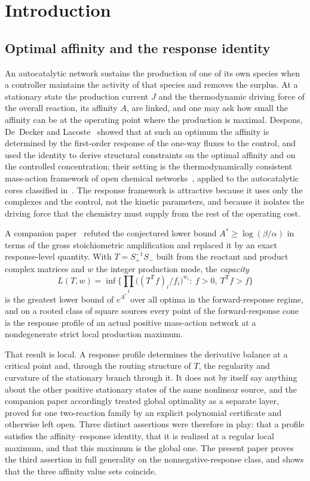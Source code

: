 \documentclass[11pt,a4paper]{article}
\theoremstyle{plain}
\theoremstyle{definition}
\theoremstyle{remark}
\numberwithin{equation}{section}
\newcommand{\T}{\mathsf{T}}
\newcommand{\Sp}{S_{+}}
\newcommand{\Sm}{S_{-}}
\begin{document}
\section{Introduction}\label{sec:intro}

\subsection{Optimal affinity and the response identity}
An autocatalytic network sustains the production of one of its own species when a controller maintains the activity of that species and removes the surplus. At a stationary state the production current $J$ and the thermodynamic driving force of the overall reaction, its affinity $A$, are linked, and one may ask how small the affinity can be at the operating point where the production is maximal. Despons, De~Decker and Lacoste~\citep{despons2024} showed that at such an optimum the affinity is determined by the first-order response of the one-way fluxes to the control, and used the identity to derive structural constraints on the optimal affinity and on the controlled concentration; their setting is the thermodynamically consistent mass-action framework of open chemical networks~\citep{polettini2014,rao2016}, applied to the autocatalytic cores classified in~\citep{blokhuis2020,unterberger2022,nandan2026}. The response framework is attractive because it uses only the complexes and the control, not the kinetic parameters, and because it isolates the driving force that the chemistry must supply from the rest of the operating cost.

A companion paper~\citep{companion2026} refuted the conjectured lower bound $A^*\ge\log(\beta/\alpha)$ in terms of the gross stoichiometric amplification and replaced it by an exact response-level quantity. With $T=\Sp^{-1}\Sm$ built from the reactant and product complex matrices and $w$ the integer production mode, the \emph{capacity}
\[
L(T,w)=\inf\Big\{\prod_i\big((T^{\T}f)_i/f_i\big)^{w_i}:\ f>0,\ T^{\T}f>f\Big\}
\]
is the greatest lower bound of $e^{A^*}$ over all optima in the forward-response regime, and on a rooted class of square sources every point of the forward-response cone is the response profile of an actual positive mass-action network at a nondegenerate strict local production maximum.

That result is local. A response profile determines the derivative balance at a critical point and, through the routing structure of $T$, the regularity and curvature of the stationary branch through it. It does not by itself say anything about the other positive stationary states of the same nonlinear source, and the companion paper accordingly treated global optimality as a separate layer, proved for one two-reaction family by an explicit polynomial certificate and otherwise left open. Three distinct assertions were therefore in play: that a profile satisfies the affinity--response identity, that it is realized at a regular local maximum, and that this maximum is the global one. The present paper proves the third assertion in full generality on the nonnegative-response class, and shows that the three affinity value sets coincide.
\end{document}
